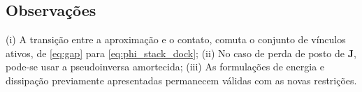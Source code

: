 \subsection{Observações}
(i) A transição entre a aproximação e o contato, comuta o conjunto de vínculos ativos,
de \eqref{eq:gap} para \eqref{eq:phi_stack_dock}; 
(ii) No caso de perda de posto de $\mathbf J$, pode-se usar a pseudoinversa amortecida; 
(iii) As formulações de energia e dissipação previamente apresentadas permanecem válidas com as novas restrições.
